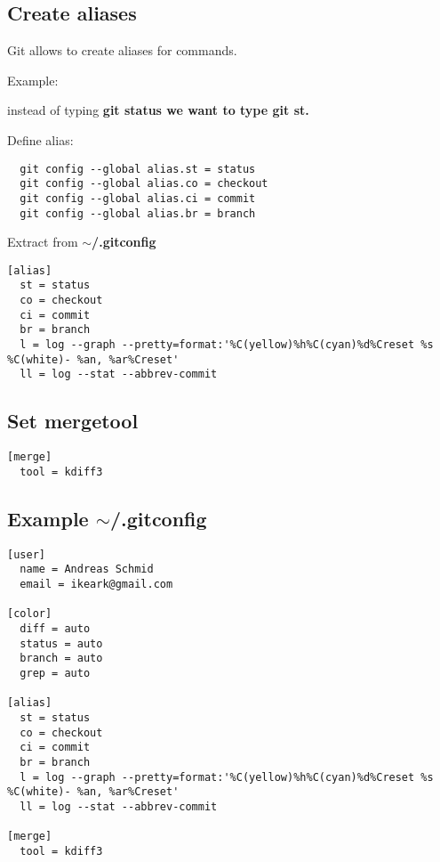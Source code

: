 \subsection{Create aliases}
\begin{frame}[fragile]
  \subslidetitle

  Git allows to create aliases for commands.

  Example:

  instead of typing \bf{git status} we want to type \bf{git st}.

  Define alias:
  \begin{lstlisting}
  git config --global alias.st = status
  git config --global alias.co = checkout
  git config --global alias.ci = commit
  git config --global alias.br = branch
  \end{lstlisting}


  Extract from \bf{$\sim$/.gitconfig}
\begin{lstlisting}
[alias]
  st = status
  co = checkout
  ci = commit
  br = branch
  l = log --graph --pretty=format:'%C(yellow)%h%C(cyan)%d%Creset %s %C(white)- %an, %ar%Creset'
  ll = log --stat --abbrev-commit
\end{lstlisting}
\end{frame}

\subsection{Set mergetool}
\begin{frame}[fragile]
  \subslidetitle
\begin{lstlisting}
[merge]
  tool = kdiff3
\end{lstlisting}
\end{frame}

\subsection{Example $\sim$/.gitconfig}
\begin{frame}[fragile]
  \subslidetitle

\begin{lstlisting}
[user]
  name = Andreas Schmid
  email = ikeark@gmail.com

[color]
  diff = auto
  status = auto
  branch = auto
  grep = auto

[alias]
  st = status
  co = checkout
  ci = commit
  br = branch
  l = log --graph --pretty=format:'%C(yellow)%h%C(cyan)%d%Creset %s %C(white)- %an, %ar%Creset'
  ll = log --stat --abbrev-commit

[merge]
  tool = kdiff3
\end{lstlisting}
\end{frame}

